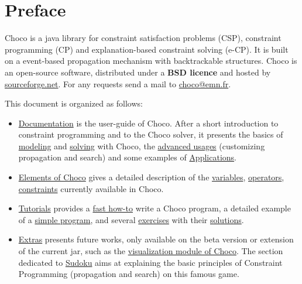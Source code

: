 \chapter*{Preface}
Choco is a java library for constraint satisfaction problems (CSP), constraint programming (CP) and explanation-based constraint solving (e-CP). It is built on a event-based propagation mechanism with backtrackable structures.
Choco is an open-source software, distributed under a \textbf{BSD licence} and hosted by \href{http://sourceforge.net/projects/choco/}{sourceforge.net}.
For any requests send a mail to \url{choco@emn.fr}.
\bigskip

\noindent This document is organized as follows:
\begin{itemize}
\item \hyperlink{ch:doc}{Documentation} is the user-guide of Choco. After a short \hypertarget{doc:introduction}{introduction} to constraint programming and to the Choco solver, it presents the basics of \hyperlink{doc:model}{modeling} and \hyperlink{doc:solver}{solving} with Choco, the \hyperlink{doc:advanced}{advanced usages} (customizing propagation and search) and some examples of \hyperlink{doc:applications}{Applications}.
\item \hyperlink{part:elements}{Elements of Choco} gives a detailed description of the \hyperlink{ch:vars}{variables}, \hyperlink{ch:operators}{operators}, \hyperlink{ch:constraints}{constraints} currently available in Choco.
\item \hyperlink{ch:tut}{Tutorials} provides a \hyperlink{gettingstarted:gettingstarted:welcometochoco}{fast how-to} write a Choco program, a detailed example of a \hyperlink{gettingstarted:firstexample:magicsquare}{simple program}, and several \hyperlink{exercises}{exercises} with their \hyperlink{solutions}{solutions}.
\item \hyperlink{ch:extra}{Extras} presents future works, only available on the beta version or extension of the current jar, such as the \hyperlink{chocoandvisu:chocoandvisu}{visualization module of Choco}. The section dedicated to \hyperlink{sudokuandcp:sudokuandconstraintprogramming}{Sudoku} aims at explaining the basic principles of Constraint Programming (propagation and search) on this famous game.

\end{itemize}

